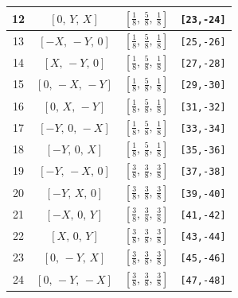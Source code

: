 \documentclass[fleqn,8pt]{jsarticle}
\begin{document}
\begin{longtable}{cccc}
12 & $\left[ 0,\, Y,\, X \right]$ & $\left[ \frac{1}{8},\, \frac{5}{8},\, \frac{1}{8} \right]$ & {\tt [23,-24]} \\ \hline
13 & $\left[ - X,\, - Y,\, 0 \right]$ & $\left[ \frac{1}{8},\, \frac{5}{8},\, \frac{1}{8} \right]$ & {\tt [25,-26]} \\ \hline
14 & $\left[ X,\, - Y,\, 0 \right]$ & $\left[ \frac{1}{8},\, \frac{5}{8},\, \frac{1}{8} \right]$ & {\tt [27,-28]} \\ \hline
15 & $\left[ 0,\, - X,\, - Y \right]$ & $\left[ \frac{1}{8},\, \frac{5}{8},\, \frac{1}{8} \right]$ & {\tt [29,-30]} \\ \hline
16 & $\left[ 0,\, X,\, - Y \right]$ & $\left[ \frac{1}{8},\, \frac{5}{8},\, \frac{1}{8} \right]$ & {\tt [31,-32]} \\ \hline
17 & $\left[ - Y,\, 0,\, - X \right]$ & $\left[ \frac{1}{8},\, \frac{5}{8},\, \frac{1}{8} \right]$ & {\tt [33,-34]} \\ \hline
18 & $\left[ - Y,\, 0,\, X \right]$ & $\left[ \frac{1}{8},\, \frac{5}{8},\, \frac{1}{8} \right]$ & {\tt [35,-36]} \\ \hline
19 & $\left[ - Y,\, - X,\, 0 \right]$ & $\left[ \frac{3}{8},\, \frac{3}{8},\, \frac{3}{8} \right]$ & {\tt [37,-38]} \\ \hline
20 & $\left[ - Y,\, X,\, 0 \right]$ & $\left[ \frac{3}{8},\, \frac{3}{8},\, \frac{3}{8} \right]$ & {\tt [39,-40]} \\ \hline
21 & $\left[ - X,\, 0,\, Y \right]$ & $\left[ \frac{3}{8},\, \frac{3}{8},\, \frac{3}{8} \right]$ & {\tt [41,-42]} \\ \hline
22 & $\left[ X,\, 0,\, Y \right]$ & $\left[ \frac{3}{8},\, \frac{3}{8},\, \frac{3}{8} \right]$ & {\tt [43,-44]} \\ \hline
23 & $\left[ 0,\, - Y,\, X \right]$ & $\left[ \frac{3}{8},\, \frac{3}{8},\, \frac{3}{8} \right]$ & {\tt [45,-46]} \\ \hline
24 & $\left[ 0,\, - Y,\, - X \right]$ & $\left[ \frac{3}{8},\, \frac{3}{8},\, \frac{3}{8} \right]$ & {\tt [47,-48]} \\
\end{longtable}
\renewcommand{\arraystretch}{1.2}
\end{document}
